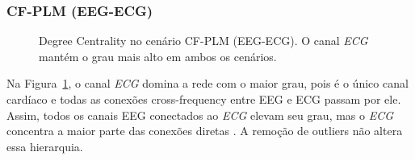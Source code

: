 \subsubsection{CF-PLM (EEG-ECG)}
\begin{figure}[htb]
    \centering
    \quad
    \caption{Degree Centrality no cenário CF-PLM (EEG-ECG). O canal \emph{ECG} mantém o grau mais alto em ambos os cenários.}
    \label{fig:dc_cfplm_eegecg}
\end{figure}

Na Figura~\ref{fig:dc_cfplm_eegecg}, o canal \emph{ECG} domina a rede com o maior grau, pois é o único canal cardíaco e todas as conexões cross-frequency entre EEG e ECG passam por ele. Assim, todos os canais EEG conectados ao \emph{ECG} elevam seu grau, mas o \emph{ECG} concentra a maior parte das conexões diretas \cite{rubinov2010complex}. A remoção de outliers não altera essa hierarquia.

